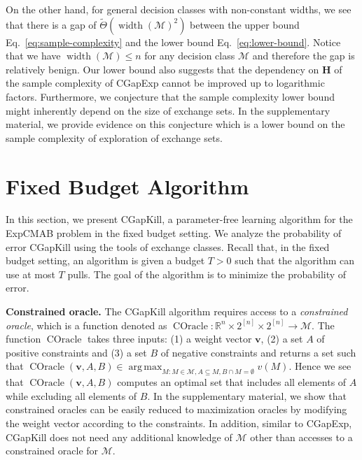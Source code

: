 \documentclass{article}
\newcommand{\Algorithm}{{\small \textsf{CGapExp}}\xspace}
\newcommand{\AlgorithmBud}{{\small \textsf{CGapKill}}\xspace}
\newcommand{\Problem}{{\small \textsf{ExpCMAB}}\xspace}
\newcommand{\M}{\mathcal M}
\newcommand{\RR}{\mathbb R}
\DeclareMathOperator{\rank}{width}
\DeclareMathOperator*{\argmax}{arg\,max}
\DeclareMathOperator{\COracle}{COracle}
\newcommand{\Match}{\textsc{Match}\xspace}
\newcommand{\Path}{\textsc{Path}\xspace}
\renewcommand{\vec}[1]{\boldsymbol{#1}}
\begin{document}
On the other hand, for general decision classes with non-constant widths, we see that there is a gap of $\tilde \Theta(\rank(\M)^2)$ between the upper bound Eq.~\eqref{eq:sample-complexity} and the lower bound Eq.~\eqref{eq:lower-bound}.
Notice that we have $\rank(\M) \le n$ for any decision class $\M$ and therefore the gap is relatively benign.
Our lower bound also suggests that the dependency on $\mathbf H$ of the sample complexity of \Algorithm cannot be improved up to logarithmic factors.
Furthermore, we conjecture that the sample complexity lower bound might inherently depend on the size of exchange sets. 
In the supplementary material, we provide evidence on this conjecture which is a lower bound on the sample complexity of exploration of exchange sets.


\section{Fixed Budget Algorithm}
In this section, we present \AlgorithmBud, a parameter-free learning algorithm for the \Problem problem in the fixed budget setting.
We analyze the probability of error \AlgorithmBud using the tools of exchange classes.
Recall that, in the fixed budget setting, an algorithm is given a budget $T>0$ such that the algorithm can use at most $T$ pulls.
The goal of the algorithm is to minimize the probability of error. 

\textbf{Constrained oracle.} 
The \AlgorithmBud algorithm requires access to a \emph{constrained oracle}, which is a function denoted as $\COracle: \RR^{n}\times 2^{[n]} \times 2^{[n]} \rightarrow \M$.
The function $\COracle$ takes three inputs: (1) a weight vector $\vec v$, (2) a set $A$ of positive constraints and (3) a set $B$ of negative constraints and returns a set such that
$\COracle(\vec v, A, B) \in \argmax_{M: M\in \M, A\subseteq M, B\cap M =\emptyset} v(M).$
Hence we see that $\COracle(\vec v, A, B)$ computes an optimal set that includes all elements of $A$ while excluding all elements of $B$.
In the supplementary material, we show that constrained oracles can be easily reduced to maximization oracles by modifying the weight vector according to the constraints. 
In addition, similar to \Algorithm, \AlgorithmBud does not need any additional knowledge of $\M$ other than accesses to a constrained oracle for $\M$.
\end{document}
